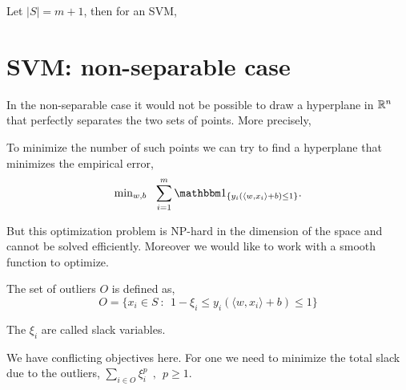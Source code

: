 \documentclass[a4paper,english,12pt]{article}
\begin{document}
\begin{thm}
Let $|S| =  m+1$, then for an SVM,
\end{thm}


\section*{SVM: non-separable case}

In the non-separable case it would not be possible to draw a hyperplane in $\mathbb{R}^n$ that perfectly separates the two sets of points. More precisely,


To minimize the number of such points we can try to find a hyperplane that  minimizes the empirical error, $$ {\min}_{w,b} ~~\sum_{i =1}^{m} \one_{\{ y_i( \langle w, x_i \rangle + b) \leq 1 \}}. $$

But this optimization problem is NP-hard in the dimension of the space and cannot be solved efficiently. Moreover we would like to work with a smooth function to optimize.

\begin{defn}[Outliers]

The set of outliers $O$ is defined as,
$$ O =  \{ x_i \in S ~ :~~ 1 - \xi_i \leq  y_i( \langle w, x_i \rangle + b) \leq 1  \}$$
\end{defn}

The $\xi_i$ are called slack variables. 

We have conflicting objectives here. For one we need to minimize the total slack due to the outliers,   $ \sum_{i \in O} \xi_i^p~~,~~p \geq 1.$
\end{document}

